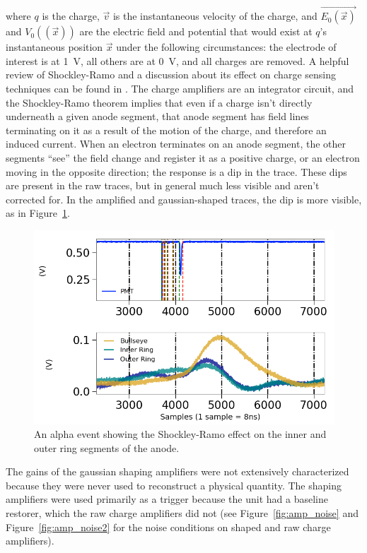 where $q$ is the charge, $\vec{v}$ is the instantaneous velocity of the charge, and $\vec{E_{0}(\vec{x})}$ and $V_{0}((\vec{x}))$ are the electric field and potential that would exist at $q$'s instantaneous position $\vec{x}$ under the following circumstances: the electrode of interest is at 1~V, all others are at 0~V, and all charges are removed. A helpful review of Shockley-Ramo and a discussion about its effect on charge sensing techniques can be found in \cite{He2001}. The charge amplifiers are an integrator circuit, and the Shockley-Ramo theorem implies that even if a charge isn't directly underneath a given anode segment, that anode segment has field lines terminating on it as a result of the motion of the charge, and therefore an induced current. When an electron terminates on an anode segment, the other segments ``see'' the field change and register it as a positive charge, or an electron moving in the opposite direction; the response is a dip in the trace. These dips are present in the raw traces, but in general much less visible and aren't corrected for. In the amplified and gaussian-shaped traces, the dip is more visible, as in Figure~\ref{fig:shockley_ramo}.


 \begin{figure}[htbp]
\begin{center}
\includegraphics[width =\textwidth ]{figures/testbed/shockley_ramo.png}
\caption{An alpha event showing the Shockley-Ramo effect on the inner and outer ring segments of the anode.}
\label{fig:shockley_ramo}
\end{center}
\end{figure}


The gains of the gaussian shaping amplifiers were not extensively characterized because they were never used to reconstruct a physical quantity. The shaping amplifiers were used primarily as a trigger because the unit had a baseline restorer, which the raw charge amplifiers did not (see Figure~\ref{fig:amp_noise} and Figure~\ref{fig:amp_noise2} for the noise conditions on shaped and raw charge amplifiers).

